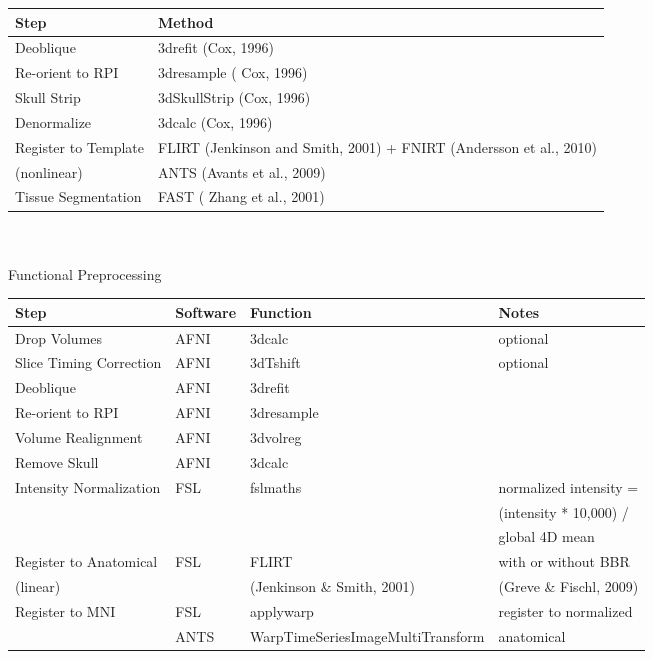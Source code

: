 \begin{tabular}{| l | l |}
	\hline
	Step & Method  \\ \hline
	Deoblique & 3drefit (Cox, 1996)  \\ \hline
	Re-orient to RPI & 3dresample ( Cox, 1996) \\ \hline
	Skull Strip & 3dSkullStrip (Cox, 1996) \\ \hline
	Denormalize & 3dcalc (Cox, 1996) \\ \hline
	Register to Template & FLIRT (Jenkinson and Smith, 2001) + FNIRT (Andersson et al., 2010) \\
	(nonlinear) & ANTS (Avants et al., 2009)  \\ \hline
	Tissue Segmentation & FAST ( Zhang et al., 2001)\\ 
	\hline
\end{tabular}
\\
\\

Functional Preprocessing \\

\begin{tabular}{| l | l | l | p{3.5cm} |}
	\hline
	Step & Software  & Function & Notes \\ \hline
	Drop Volumes & AFNI & 3dcalc & optional\\ \hline
	Slice Timing Correction & AFNI & 3dTshift & optional \\ \hline
	Deoblique & AFNI & 3drefit & \\ \hline
	Re-orient to RPI & AFNI & 3dresample & \\ \hline
	Volume Realignment & AFNI & 3dvolreg & \\ \hline
	Remove Skull  & AFNI & 3dcalc & \\ \hline
	Intensity Normalization & FSL & fslmaths & normalized intensity = \\ & & & (intensity * 10,000) / \\ & & & global 4D mean \\ \hline
	Register to Anatomical & FSL & FLIRT & with or without BBR \\ (linear) & & (Jenkinson \& Smith, 2001) & (Greve \& Fischl, 2009)\\ \hline
	Register to MNI & FSL & applywarp & register to normalized \\ \cline{2-3}
	& ANTS & WarpTimeSeriesImageMultiTransform & anatomical \\ 
	\hline
\end{tabular}
